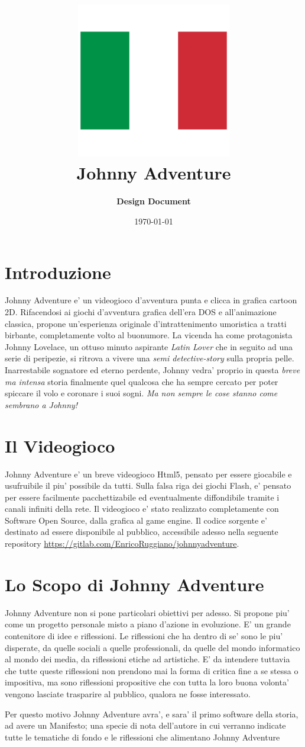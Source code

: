 \documentclass[11pt]{article}
\title{
	\includegraphics[scale = 0.25]{img/italy_flag.png}\\
	\textbf{Johnny Adventure}}
\author{\textbf{Design Document}}
\date{\today}
\begin{document}
\maketitle

\section{Introduzione}
Johnny Adventure e' un videogioco d'avventura punta e clicca in grafica cartoon 2D.
Rifacendosi ai giochi d'avventura grafica dell'era DOS e all'animazione classica, propone un'esperienza originale d'intrattenimento umoristica a tratti birbante, completamente volto al buonumore.  
La vicenda ha come protagonista Johnny Lovelace, un ottuso minuto aspirante \emph{Latin Lover} che in seguito ad una serie di peripezie, si ritrova a vivere una \emph{semi detective-story} sulla propria pelle.
Inarrestabile sognatore ed eterno perdente, Johnny vedra' proprio in questa \emph{breve ma intensa} storia finalmente quel qualcosa che ha sempre cercato per poter spiccare il volo e coronare i suoi sogni.
\emph{Ma non sempre le cose stanno come sembrano a Johnny!}
         
\section{Il Videogioco}
Johnny Adventure e' un breve videogioco Html5, pensato per essere giocabile e usufruibile il piu' possibile da tutti. Sulla falsa riga dei giochi Flash, e' pensato per essere facilmente pacchettizabile ed eventualmente diffondibile tramite i canali infiniti della rete. Il videogioco e' stato realizzato completamente con Software Open Source, dalla grafica al game engine. Il codice sorgente e' destinato ad essere disponibile al pubblico, accessibile adesso nella seguente repository \url{https://gitlab.com/EnricoRuggiano/johnnyadventure}.

\section{Lo Scopo di Johnny Adventure}
Johnny Adventure non si pone particolari obiettivi per adesso. Si propone piu' come un progetto personale misto a piano d'azione in evoluzione. E' un grande contenitore di idee e riflessioni. 
Le riflessioni che ha dentro di se' sono le piu' disperate, da quelle sociali a quelle professionali, da quelle del mondo informatico al mondo dei media, da riflessioni etiche ad artistiche.
E' da intendere tuttavia che tutte queste riflessioni non prendono mai la forma di critica fine a se stessa o impositiva, ma sono riflessioni propositive che con tutta la loro buona volonta' vengono lasciate trasparire al pubblico, qualora ne fosse interessato.

Per questo motivo Johnny Adventure avra', e sara' il primo software della storia, ad avere un Manifesto; una specie di nota dell'autore in cui verranno indicate tutte le tematiche di fondo e le riflessioni che alimentano Johnny Adventure
 
\end{document}
